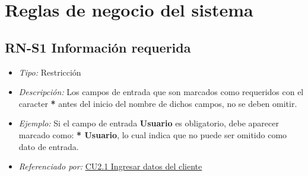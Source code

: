 
\pagebreak
\section{Reglas de negocio del sistema}

	\hypertarget{RN:S1:InfoRequerida}{}
	\subsection{RN-S1 Información requerida}
		
		\begin{itemize}

			\item \textit{Tipo:} Restricción

			\item \textit{Descripción:} Los campos de entrada que son marcados como requeridos con el caracter \textbf{*} antes del inicio del nombre de dichos campos, no se deben omitir.

			\item \textit{Ejemplo:} Si el campo de entrada \textbf{Usuario} es obligatorio, debe aparecer marcado como: \textbf{* Usuario}, lo cual indica que no puede ser omitido como dato de entrada.

			\item \textit{Referenciado por:} \hyperlink{CU2.1}{CU2.1 Ingresar datos del cliente}

		\end{itemize}

